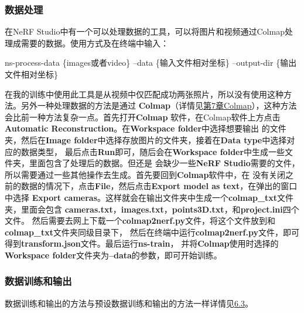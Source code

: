\documentclass{nwputhesis}
\begin{document}
\subsubsection{数据处理}
在NeRF Studio中有一个可以处理数据的工具，可以将图片和视频通过Colmap处理成需要的数据。使用方式及在终端中输入：
\begin{center}
    ns-process-data \{images或者video\} --data \{输入文件相对坐标\} --output-dir \{输出文件相对坐标\}
\end{center}
在我的训练中使用此工具是从视频中仅匹配成功两张照片，所以没有使用这种方法。另外一种处理数据的方法是通过\textbf{
Colmap}（详情见\hyperlink{section 7}{第7章Colmap}），这种方法会比前一种方法复杂一点。首先打开\textbf{Colmap}
软件，在Colmap软件上方点击\textbf{Automatic Reconstruction}。在\textbf{Workspace folder}中选择想要输出
的文件夹，然后在\textbf{Image folder}中选择存放图片的文件夹，接着在\textbf{Data type}中选择对应的数据类型，
最后点击\textbf{Run}即可，随后会在\textbf{Workspace folder}中生成一些文件夹，里面包含了处理后的数据。但还是
会缺少一些\textbf{NeRF Studio}需要的文件，所以需要通过一些其他操作去生成。首先要回到\textbf{Colmap}软件中，在
没有关闭之前的数据的情况下，点击\textbf{File}，然后点击\textbf{Export model as text}，在弹出的窗口中选择
\textbf{Export cameras}。这样就会在输出文件夹中生成一个\textbf{colmap\_txt}文件夹，里面会包含
\textbf{cameras.txt}，\textbf{images.txt}，\textbf{points3D.txt}，和\textbf{project.ini}四个文件。
然后需要去网上下载一个\textbf{colmap2nerf.py}文件，将这个文件放到和\textbf{colmap\_txt}文件夹同级目录下，
然后在终端中运行\textbf{colmap2nerf.py}文件，即可得到\textbf{transform.json}文件。最后运行\textbf{ns-train}，
并将\textbf{Colmap}使用时选择的\textbf{Workspace folder}文件夹为\textbf{--data}的参数，即可开始训练。
\subsubsection{数据训练和输出}
数据训练和输出的方法与预设数据训练和输出的方法一样详情见\hyperlink{6.3}{6.3}。
\end{document}
